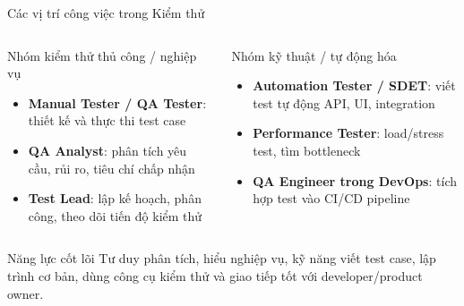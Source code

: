 \documentclass[aspectratio=169,12pt]{beamer}
\begin{document}
\begin{frame}{Các vị trí công việc trong Kiểm thử}
  \small
  \begin{columns}[T,totalwidth=\textwidth]
    \begin{block}{Nhóm kiểm thử thủ công / nghiệp vụ\vphantom{ỹể}}
      \begin{itemize}
        \item \textbf{Manual Tester / QA Tester}: thiết kế và thực thi test case
        \item \textbf{QA Analyst}: phân tích yêu cầu, rủi ro, tiêu chí chấp nhận
        \item \textbf{Test Lead}: lập kế hoạch, phân công, theo dõi tiến độ kiểm thử
      \end{itemize}
    \end{block}

    \begin{block}{Nhóm kỹ thuật / tự động hóa\vphantom{ỹể}}
      \begin{itemize}
        \item \textbf{Automation Tester / SDET}: viết test tự động API, UI, integration
        \item \textbf{Performance Tester}: load/stress test, tìm bottleneck
        \item \textbf{QA Engineer trong DevOps}: tích hợp test vào CI/CD pipeline
      \end{itemize}
    \end{block}
  \end{columns}

  \vspace{0.25em}
  \begin{alertblock}{Năng lực cốt lõi}
    Tư duy phân tích, hiểu nghiệp vụ, kỹ năng viết test case, lập trình cơ bản,
    dùng công cụ kiểm thử và giao tiếp tốt với developer/product owner.
  \end{alertblock}
\end{frame}
\end{document}
